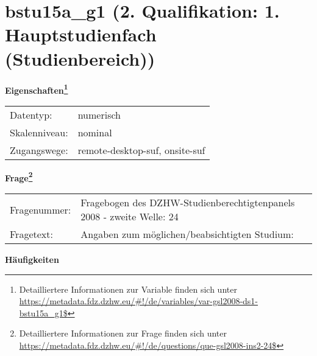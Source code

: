 
    \setcounter{footnote}{0}

    \vspace*{-1.8cm}
	\section{bstu15a\_g1 (2. Qualifikation: 1. Hauptstudienfach (Studienbereich))}
	\label{section:bstu15a_g1}



    \vspace*{0.5cm}
    \noindent\textbf{Eigenschaften\footnote{Detailliertere Informationen zur Variable finden sich unter
		\url{https://metadata.fdz.dzhw.eu/\#!/de/variables/var-gsl2008-ds1-bstu15a_g1$}}}\\
	\begin{tabularx}{\hsize}{@{}lX}
	Datentyp: & numerisch \\
	Skalenniveau: & nominal \\
	Zugangswege: &
	  remote-desktop-suf, 
	  onsite-suf
 \\
    \end{tabularx}



				\vspace*{0.5cm}
                \noindent\textbf{Frage\footnote{Detailliertere Informationen zur Frage finden sich unter
		              \url{https://metadata.fdz.dzhw.eu/\#!/de/questions/que-gsl2008-ins2-24$}}}\\
				\begin{tabularx}{\hsize}{@{}lX}
					Fragenummer: &
					  Fragebogen des DZHW-Studienberechtigtenpanels 2008 - zweite Welle:
					  24
 \\
					Fragetext: & Angaben zum möglichen/beabsichtigten Studium: \\
				\end{tabularx}





        		\vspace*{0.5cm}
                \noindent\textbf{Häufigkeiten}

